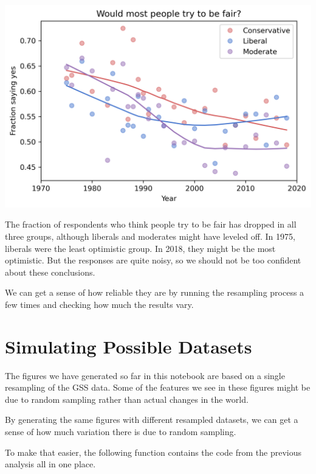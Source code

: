 \begin{center}
\includegraphics[scale=0.75]{03_outlook_files/03_outlook_55_0.png}
\end{center}

The fraction of respondents who think people try to be fair has dropped
in all three groups, although liberals and moderates might have leveled
off. In 1975, liberals were the least optimistic group. In 2018, they
might be the most optimistic. But the responses are quite noisy, so we
should not be too confident about these conclusions.

We can get a sense of how reliable they are by running the resampling
process a few times and checking how much the results vary.

\hypertarget{simulating-possible-datasets}{%
\section{Simulating Possible
Datasets}\label{simulating-possible-datasets}}

The figures we have generated so far in this notebook are based on a
single resampling of the GSS data. Some of the features we see in these
figures might be due to random sampling rather than actual changes in
the world.

By generating the same figures with different resampled datasets, we can
get a sense of how much variation there is due to random sampling.

To make that easier, the following function contains the code from the
previous analysis all in one place.

